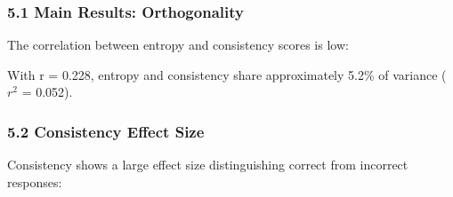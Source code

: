 
\subsubsection{5.1 Main Results: Orthogonality}

The correlation between entropy and consistency scores is low:

\begin{table}[htbp]
\centering
{}
\end{table}

With r = 0.228, entropy and consistency share approximately 5.2\% of variance ($r^2$ = 0.052).

\subsubsection{5.2 Consistency Effect Size}

Consistency shows a large effect size distinguishing correct from incorrect responses:

\begin{table}[htbp]
\centering
{}
\end{table}

\begin{table}[htbp]
\centering
{}
\end{table}


